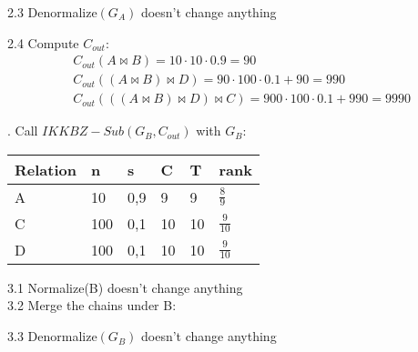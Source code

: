\documentclass{article}
\begin{document}
\vspace*{1cm}
2.3 Denormalize$(G_A)$ doesn't change anything

2.4 Compute $C_{out}$:
\begin{align}
& C_{out}(A \bowtie B) = 10 \cdot 10 \cdot 0.9 = 90 \nonumber \\
& C_{out}((A \bowtie B) \bowtie D) = 90 \cdot 100 \cdot 0.1 + 90 = 990 \nonumber \\
& C_{out}(((A \bowtie B) \bowtie D) \bowtie C) = 900 \cdot 100 \cdot 0.1 + 990 = 9990 \nonumber
\end{align}






. Call $IKKBZ-Sub(G_B,C_{out})$ with $G_B:$


\begin{table}[!hbtp]
\begin{tabular}{|l|l|l|l|l|l|}
\hline
Relation & n   & s   & C  & T  & rank           \\ \hline
A        & 10  & 0,9 & 9  & 9  & $\frac{8}{9}$  \\ \hline
C        & 100 & 0,1 & 10 & 10 & $\frac{9}{10}$ \\ \hline
D        & 100 & 0,1 & 10 & 10 & $\frac{9}{10}$ \\ \hline
\end{tabular}
\end{table}

3.1 Normalize(B) doesn't change anything\\

3.2 Merge the chains under B:


\vspace*{1cm}
3.3 Denormalize$(G_B)$ doesn't change anything
\end{document}
